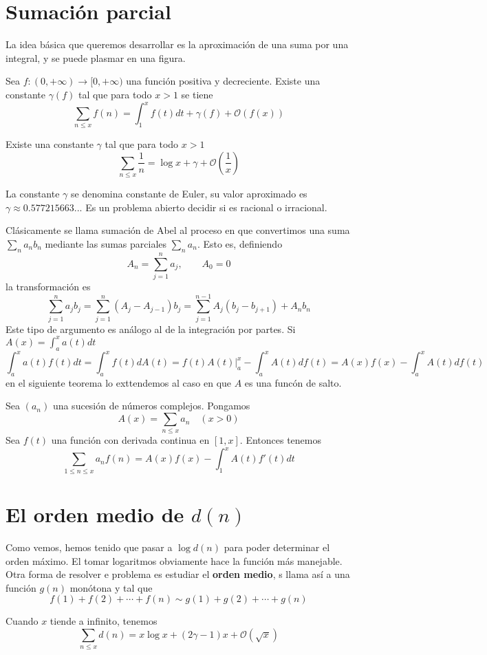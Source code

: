 \documentclass[TAN.tex]{subfiles}
\begin{document}
\section{Sumación parcial}
La idea básica que queremos desarrollar es la aproximación de una suma por una integral, y se puede plasmar en una figura.

\begin{teorema}
Sea $f : (0,+\infty) \to [0,+\infty)$ una función positiva y decreciente. Existe una constante $γ(f)$ tal que para todo $x>1$ se tiene
\[ \sum_{n≤x} f(n) = \int_1^x f(t)dt + γ(f) + \mathcal{O}(f(x)) \]
\end{teorema}
\begin{teorema}
Existe una constante $γ$ tal que para todo $x>1$
\[ \sum_{n≤x} \frac{1}{n} = \log x + γ + \mathcal{O}\left(\frac{1}{x}\right) \]
\end{teorema}
La constante $γ$ se denomina constante de Euler, su valor aproximado es $γ \approx 0.577215663...$ Es un problema abierto decidir si es racional o irracional.

Clásicamente se llama sumación de Abel al proceso en que convertimos una suma $\sum_n a_n b_n$ mediante las sumas parciales $\sum_n a_n$. Esto es, definiendo
\[ A_n = \sum_{j=1}^n a_j, \qquad A_0 = 0 \]
la transformación es
\[ \sum_{j=1}^n a_j b_j = \sum_{j=1}^n (A_j-A_{j-1})b_j = \sum_{j=1}^{n-1} A_j(b_j-b_{j+1}) + A_n b_n \]
Este tipo de argumento es análogo al de la integración por partes. Si $A(x)=\int_a^x a(t)dt$
\[ \int_a^x a(t)f(t) dt = \int_a^x f(t) dA(t) = \left.f(t)A(t)\right|_a^x - \int_a^x A(t) df(t) = A(x)f(x) - \int_a^x A(t) df(t) \]
en el siguiente teorema lo exttendemos al caso en que $A$ es una funcón de salto.

\begin{teorema} Sea $(a_n)$ una sucesión de números complejos. Pongamos
\[ A(x) = \sum_{n≤x} a_n \quad (x > 0) \]
Sea $f(t)$ una función con derivada continua en $[1,x]$. Entonces tenemos
\[ \sum_{1≤n≤x} a_nf(n) = A(x)f(x)-\int_1^x A(t)f'(t)dt \]
\end{teorema}
\section{El orden medio de $d(n)$}
Como vemos, hemos tenido que pasar a $\log d(n)$ para poder determinar el orden máximo. El tomar logaritmos obviamente hace la función más manejable. Otra forma de resolver e problema es estudiar el \textbf{orden medio}, s llama así a una función $g(n)$ monótona y tal que
\[ f(1) + f(2) + \cdots + f(n) \sim g(1) + g(2) + \cdots + g(n) \]
\begin{teorema}[Dirichlet]
Cuando $x$ tiende a infinito, tenemos
\[ \sum_{n≤x} d(n) = x \log x + (2γ -1)x + \mathcal{O}(\sqrt{x}) \]
\end{teorema}
\end{document}

